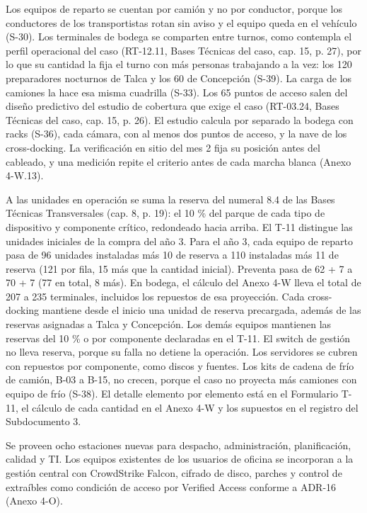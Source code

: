 Los equipos de reparto se cuentan por camión y no por conductor, porque los conductores de los transportistas rotan sin aviso y el equipo queda en el vehículo (S-30). Los terminales de bodega se comparten entre turnos, como contempla el perfil operacional del caso (RT-12.11, Bases Técnicas del caso, cap. 15, p. 27), por lo que su cantidad la fija el turno con más personas trabajando a la vez: los 120 preparadores nocturnos de Talca y los 60 de Concepción (S-39). La carga de los camiones la hace esa misma cuadrilla (S-33). Los 65 puntos de acceso salen del diseño predictivo del estudio de cobertura que exige el caso (RT-03.24, Bases Técnicas del caso, cap. 15, p. 26). El estudio calcula por separado la bodega con racks (S-36), cada cámara, con al menos dos puntos de acceso, y la nave de los cross-docking. La verificación en sitio del mes 2 fija su posición antes del cableado, y una medición repite el criterio antes de cada marcha blanca (Anexo 4-W.13).

A las unidades en operación se suma la reserva del numeral 8.4 de las Bases Técnicas Transversales (cap. 8, p. 19): el 10 \% del parque de cada tipo de dispositivo y componente crítico, redondeado hacia arriba. El T-11 distingue las unidades iniciales de la compra del año 3. Para el año 3, cada equipo de reparto pasa de 96 unidades instaladas más 10 de reserva a 110 instaladas más 11 de reserva (121 por fila, 15 más que la cantidad inicial). Preventa pasa de 62 + 7 a 70 + 7 (77 en total, 8 más). En bodega, el cálculo del Anexo 4-W lleva el total de 207 a 235 terminales, incluidos los repuestos de esa proyección. Cada cross-docking mantiene desde el inicio una unidad de reserva precargada, además de las reservas asignadas a Talca y Concepción. Los demás equipos mantienen las reservas del 10 \% o por componente declaradas en el T-11. El switch de gestión no lleva reserva, porque su falla no detiene la operación. Los servidores se cubren con repuestos por componente, como discos y fuentes. Los kits de cadena de frío de camión, B-03 a B-15, no crecen, porque el caso no proyecta más camiones con equipo de frío (S-38). El detalle elemento por elemento está en el Formulario T-11, el cálculo de cada cantidad en el Anexo 4-W y los supuestos en el registro del Subdocumento 3.

Se proveen ocho estaciones nuevas para despacho, administración, planificación, calidad y TI. Los equipos existentes de los usuarios de oficina se incorporan a la gestión central con CrowdStrike Falcon, cifrado de disco, parches y control de extraíbles como condición de acceso por Verified Access conforme a ADR-16 (Anexo 4-O).

